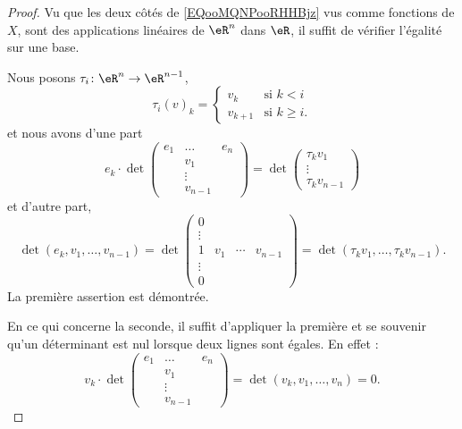 \begin{proof}
    Vu que les deux côtés de \eqref{EQooMQNPooRHHBjz} vus comme fonctions de \( X\), sont des applications linéaires de \( \eR^n\) dans \( \eR\), il suffit de vérifier l'égalité sur une base.

    Nous posons \( \tau_i\colon \eR^n\to \eR^{n-1}\),
    \begin{equation}
        \tau_i(v)_k=\begin{cases}
            v_k    &   \text{si } k<i\\
            v_{k+1}    &    \text{si } k\geq i\text{.}
        \end{cases}
    \end{equation}
    et nous avons d'une part
    \begin{equation}
        e_k\cdot
                \det
                \begin{pmatrix}
                     e_1   &   \ldots    &   e_n    \\
                        &   v_1    &       \\
                        &   \vdots    &       \\ 
                        &   v_{n-1}    &   
                 \end{pmatrix}
                 =\det\begin{pmatrix}
                     \tau_kv_1   \\ 
                     \vdots   \\ 
                     \tau_kv_{n-1}   
                 \end{pmatrix}
            \end{equation}
     et d'autre part,
     \begin{equation}
         \det(e_k,v_1,\ldots, v_{n-1})=\det
         \begin{pmatrix}
             0&&&\\  
             \vdots&&&\\  
             1&v_1&\cdots&v_{n-1}\\  
             \vdots&&&\\  
             0&&&  
         \end{pmatrix}=\det(\tau_k v_1,\ldots, \tau_k v_{n-1}).
     \end{equation}
     La première assertion est démontrée.

     En ce qui concerne la seconde, il suffit d'appliquer la première et se souvenir qu'un déterminant est nul lorsque deux lignes sont égales. En effet :
     \begin{equation}
         v_k\cdot \det
                \begin{pmatrix}
                     e_1   &   \ldots    &   e_n    \\
                        &   v_1    &       \\
                        &   \vdots    &       \\ 
                        &   v_{n-1}    &   
                 \end{pmatrix}
                 =
                 \det(v_k,v_1,\ldots, v_n)=0.
     \end{equation}
\end{proof}

